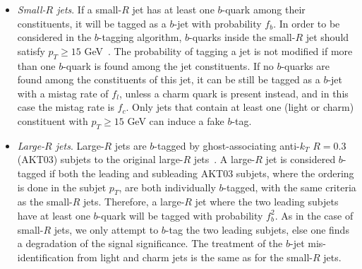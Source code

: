 \documentclass[a4paper,11pt]{article}
\begin{document}
\begin{itemize}

\item {\it Small-$R$ jets}. If a small-$R$ jet has at least one $b$-quark among their constituents,
  it will be tagged as a $b$-jet with probability $f_b$.
  In order to be considered in the $b$-tagging algorithm,
  $b$-quarks inside the small-$R$ jet
  should satisfy $p_T \ge 15$ GeV~\cite{Aad:2015ydr}.
  The probability of tagging a jet is not modified
  if more than one $b$-quark is found among the jet constituents.
  If no $b$-quarks are found among the constituents
  of this jet, it can be still be tagged as a $b$-jet with
  a mistag rate of $f_l$, unless a charm quark is present instead,
  and in this case the mistag rate is $f_c$.
  Only jets that contain at least one (light or charm)
  constituent
  with $p_T \ge 15$ GeV can induce a fake $b$-tag.
  
  \item {\it Large-$R$ jets}. Large-$R$ jets are $b$-tagged by
    ghost-associating anti-$k_T$ $R=0.3$ (AKT03)
    subjets to the original large-$R$
    jets~\cite{Cacciari:2007fd,Aad:2013gja,
      ATLAS-CONF-2014-004,Aad:2015uka}.
    A large-$R$ jet is considered $b$-tagged if both
    the leading and subleading AKT03 subjets, where the ordering
    is done in the subjet $p_T$, are both individually $b$-tagged,
    with the same criteria as the small-$R$ jets.
     Therefore, a large-$R$ jet where the two leading
    subjets have at least one $b$-quark will be tagged
    with probability $f_b^2$.
    As in the case
    of small-$R$ jets, we only attempt to $b$-tag the two leading subjets,
    else one finds a degradation of the
    signal significance.
    The treatment of the $b$-jet mis-identification
    from light and charm jets
    is the same as for the small-$R$ jets.
  
\end{itemize}
\end{document}
